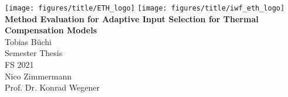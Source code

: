 \documentclass[paper=a4,twoside=true,fontsize=11pt,numbers=noendperiod,chapterprefix=false]{scrbook}
\begin{document}
%


\newcommand{\mykeyword}[0]{my long text}
\newcommand{\chpref}[1]{Chapter \ref{#1}}
\newcommand{\secref}[1]{Section \ref{#1}}
\newcommand{\figref}[1]{Figure \ref{#1}}
\newcommand{\tabref}[1]{Table \ref{#1}}
\newcommand{\apxref}[1]{Appendix \ref{#1}}

\setcounter{page}{-1}  %
\begin{titlepage}
	\topmargin -3.8cm
	\oddsidemargin 0.0cm
	\evensidemargin 0.0cm
	\centering
	\texttt{[image: figures/title/ETH\_logo]} \hfill
	\texttt{[image: figures/title/iwf\_eth\_logo]} \\
	\vspace{7.2cm} %
	\Huge
	\textbf{\textsf{Method Evaluation for Adaptive Input Selection for Thermal Compensation Models}} \\[2.0cm]
	\vspace{4.0cm} %
	\sffamily
	\Large
	Tobias Büchi
	\\[0.8cm]
	\large
	Semester Thesis
	\\
	FS 2021
	\\[0.8cm] %
	Nico Zimmermann 
	\\[0.5cm]
	Prof. Dr. Konrad Wegener
	\vfill
\end{titlepage}
\clearemptydoublepage
\end{document}
